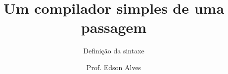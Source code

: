 \title{Um compilador simples de uma passagem}
\subtitle{Definição da sintaxe}
\date{}
\author{Prof. Edson Alves}

